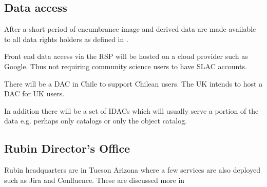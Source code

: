 \subsection{Data access}
After a short period of encumbrance image and derived data are made available to all
data rights holders as defined in .

Front end data access via the \gls{RSP} will be hosted on a cloud provider such as Google.
Thus not requiring community science users to have SLAC accounts.

There will  be a \gls{DAC} in Chile to support Chilean users. The UK intends to host a DAC for UK users.

In addition there will be a set of \gls{IDAC}s which will usually serve a portion of the data e.g. perhaps only catalogs or only the object catalog.


\subsection{Rubin Director's Office}
Rubin headquarters are in Tucson Arizona where a few services are also deployed such as Jira and Confluence.
These are discussed more in 


